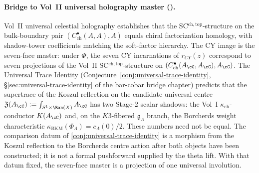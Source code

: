 \paragraph{Bridge to Vol~II universal holography master (\cite{VolII}).}
Vol~II universal celestial holography establishes that the
SC$^{\mathrm{ch,top}}$-structure on the bulk-boundary pair
$(C^\bullet_{\mathrm{ch}}(A,A), A)$ equals chiral factorization homology,
with shadow-tower coefficients matching the soft-factor hierarchy.
The CY image is the seven-face master: under $\Phi$, the seven CY
incarnations of $r_{CY}(z)$ correspond to seven projections of the
Vol~II SC$^{\mathrm{ch,top}}$-structure on $(C^\bullet_{\mathrm{ch}}(A_\cC, A_\cC), A_\cC)$.
The Universal Trace Identity
(Conjecture~\ref{conj:universal-trace-identity},
\S\ref{sec:universal-trace-identity} of the bar-cobar bridge chapter)
predicts that the supertrace of the Koszul reflection on the candidate
universal centre $\mathfrak{Z}(A_\cC) := \int_{S^1 \times \Ran(X)} A_\cC$
has two Stage-$2$ scalar shadows: the Vol~I
$\kappa_{\mathrm{ch}}$-conductor $K(A_\cC)$ and, on the
$K3$-fibered $\mathfrak{g}_\Lambda$ branch, the Borcherds weight
characteristic $\kappa_{\mathrm{BKM}}(\Phi_\Lambda) = c_\Lambda(0)/2$.
These numbers need not be equal. The comparison datum of
\ref{conj:universal-trace-identity} is a morphism from the Koszul
reflection to the Borcherds centre action after both objects have been
constructed; it is not a formal pushforward supplied by the theta lift.
With that datum fixed, the seven-face master is a projection of one
universal involution.

